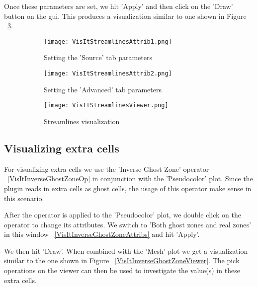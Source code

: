 Once these parameters are set, we hit 'Apply' and then click on the 'Draw' button on the gui. This produces a visualization similar to one shown in Figure ~\ref{VisItStreamlinesViewer}.
\begin{figure}[htb]
  \centering
  \begin{subfigure}[b]{0.3\textwidth}
  \centering
    \texttt{[image: VisItStreamlinesAttrib1.png]}
    \caption{Setting the 'Source' tab parameters}
    \label{VisItStreamlinesAttrib1}
  \end{subfigure}
  \begin{subfigure}[b]{0.3\textwidth}
  \centering
    \texttt{[image: VisItStreamlinesAttrib2.png]}
    \caption{Setting the 'Advanced' tab parameters}
    \label{VisItStreamlinesAttrib2}
  \end{subfigure}
  \begin{subfigure}[b]{0.3\textwidth}
  \centering
    \texttt{[image: VisItStreamlinesViewer.png]}
    \caption{Streamlines visualization}
    \label{VisItStreamlinesViewer}
  \end{subfigure}
  \caption{}
  \label{ucf.fig10}
\end{figure}


\subsection{Visualizing extra cells}
For visualizing extra cells we use the 'Inverse Ghost Zone' operator
~\ref{VisItInverseGhostZoneOp} in conjunction with the 'Pseudocolor'
plot. Since the plugin reads in extra cells as ghost cells, the usage
of this operator make sense in this scenario.

After the operator is applied to the 'Pseudocolor' plot, we double
click on the operator to change its attributes. We switch to 'Both
ghost zones and real zones' in this window
~\ref{VisItInverseGhostZoneAttribs} and hit 'Apply'.

We then hit 'Draw'. When combined with the 'Mesh' plot we get a visualization similar to the one shown in Figure ~\ref{VisItInverseGhostZoneViewer}. The pick operations on the viewer can then be used to investigate the value(s) in these extra cells. 

